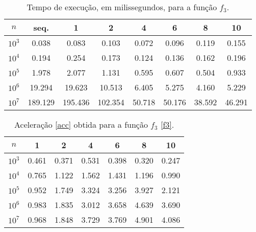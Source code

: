 \documentclass{article}
\begin{document}
        \begin{table}[h!]
          \centering
          \begin{tabular}{||c c c c c c c c||}
            \hline
            $n$ & seq. & 1 & 2 & 4 & 6 & 8 & 10 \\ 
            \hline \hline
            $10^{3}$ & 0.038 & 0.083 & 0.103 & 0.072 & 0.096 & 0.119 & 0.155 \\ 
            \hline 
            $10^{4}$ & 0.194 & 0.254 & 0.173 & 0.124 & 0.136 & 0.162 & 0.196 \\ 
            \hline 
            $10^{5}$ & 1.978 & 2.077 & 1.131 & 0.595 & 0.607 & 0.504 & 0.933 \\ 
            \hline 
            $10^{6}$ & 19.294 & 19.623 & 10.513 & 6.405 & 5.275 & 4.160 & 5.229 \\ 
            \hline 
            $10^{7}$ & 189.129 & 195.436 & 102.354 & 50.718 & 50.176 & 38.592 & 46.291 \\ 
            \hline 
          \end{tabular}
          \caption{Tempo de execução, em milissegundos, para a função $f_3$.}
          \label{f3t}
        \end{table}
      
        \begin{table}[h!]
          \centering
          \begin{tabular}{||c c c c c c c||}
            \hline
            $n$ & 1 & 2 & 4 & 6 & 8 & 10 \\ 
            \hline \hline
            $10^{3}$ & 0.461 & 0.371 & 0.531 & 0.398 & 0.320 & 0.247 \\ 
            \hline 
            $10^{4}$ & 0.765 & 1.122 & 1.562 & 1.431 & 1.196 & 0.990 \\ 
            \hline 
            $10^{5}$ & 0.952 & 1.749 & 3.324 & 3.256 & 3.927 & 2.121 \\ 
            \hline 
            $10^{6}$ & 0.983 & 1.835 & 3.012 & 3.658 & 4.639 & 3.690 \\ 
            \hline 
            $10^{7}$ & 0.968 & 1.848 & 3.729 & 3.769 & 4.901 & 4.086 \\ 
            \hline 
          \end{tabular}
          \caption{Aceleração \eqref{acc} obtida para a função $f_3$ \eqref{f3}. }
          \label{f3a}
        \end{table}
\end{document}
